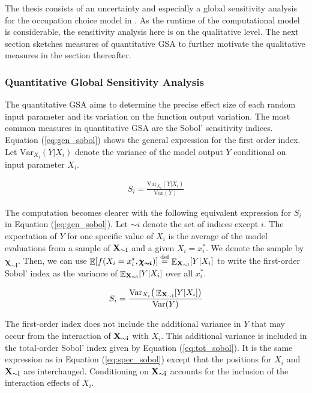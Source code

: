 \documentclass[a4paper,12pt]{article}
\DeclareMathOperator*{\E}{\mathbb{E}}
\newcommand*{\defeq}{\stackrel{\text{def}}{=}}
\begin{document}
The thesis consists of an uncertainty and especially a global sensitivity analysis for the occupation choice model in \cite{Keane.1994}. As the runtime of the computational model is considerable, the sensitivity analysis here is on the qualitative level. The next section sketches measures of quantitative GSA to further motivate the qualitative measures in the section thereafter.


\subsubsection{Quantitative Global Sensitivity Analysis}



The quantitative GSA aims to determine the precise effect size of each random input parameter and its variation on the function output variation. The most common measures in quantitative GSA are the Sobol' sensitivity indices. Equation (\ref{eq:gen_sobol}) shows the general expression for the first order index. Let $\text{Var}_{X_i} (Y|X_i)$ denote the variance of the model output $Y$ conditional on input parameter $X_i$.

\begin{align} \label{eq:gen_sobol}
S_i = \frac{\text{Var}_{X_i}(Y|X_i)}{\text{Var}(Y)}
\end{align}

\noindent
The computation becomes clearer with the following equivalent expression for $S_i$ in Equation (\ref{eq:gen_sobol}).
Let $\sim i$ denote the set of indices except $i$. The expectation of $Y$ for one specific value of $X_i$ is the average of the model evaluations from a sample of $\bold{X_{\sim i}}$ and a given
$X_i = x_i^*$. We denote the sample by $\pmb{\chi_{\sim i}}$. Then, we can use $\E[f(X_i = x_i^*,\pmb{\chi_{\sim i}} )] \defeq \E_{\bold{X_{\sim i}}} [Y|X_i ]$ to write the first-order Sobol' index as the variance of $\E_{\bold{X_{\sim i}}} [Y|X_i ]$ over all $x_i^*$.


\begin{align} \label{eq:spec_sobol}
S_i = \frac{\text{Var}_{X_i}\big( \E_{\bold{X_{\sim i}}} [Y|X_i ]\big)}{\text{Var}(Y)}
\end{align}


\noindent
The first-order index does not include the additional variance in $Y$ that may occur from the interaction of $\bold{X_{\sim i}}$ with $X_i$. This additional variance is included in the total-order Sobol' index given by Equation (\ref{eq:tot_sobol}). It is the same expression as in Equation (\ref{eq:spec_sobol}) except that the positions for $X_i$ and $\bold{X_{\sim i}}$ are interchanged. Conditioning on $\bold{X_{\sim i}}$ accounts for the inclusion of the interaction effects of $X_i$.
\end{document}

